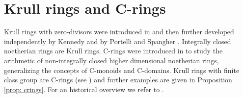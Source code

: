 \documentclass[a4paper, 10pt]{amsart}
\theoremstyle{plain}
\theoremstyle{definition}
\theoremstyle{remark}
\numberwithin{equation}{section}
\begin{document}
\section{Krull rings and C-rings}\label{4}
Krull rings with zero-divisors were introduced in \cite{Hu76} and then further developed independently by  Kennedy \cite{Ken80} and by Portelli and Spangher \cite{PS83}. Integrally closed noetherian rings are Krull rings. C-rings were introduced in \cite{GRR15} to study the arithmetic of non-integrally closed higher dimensional noetherian rings, generalizing the concepts of C-monoids and C-domains. Krull rings with finite class group are C-rings (see \cite[Corollary 4.4]{GRR15}) and further examples are given in Proposition \ref{prop: crings}. For an historical overview we refer to \cite{CO23}.

\smallskip
\end{document}
